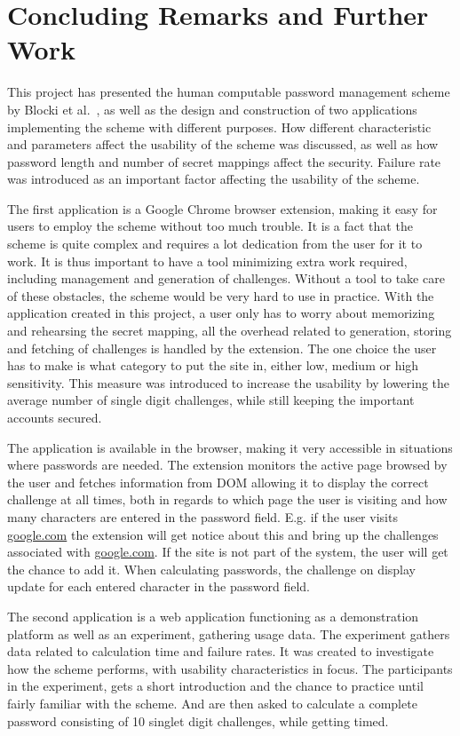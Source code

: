 \chapter{Concluding Remarks and Further Work}
This project has presented the human computable password management scheme by Blocki et al.~\cite{hcp-blocki}, as well as the design and construction of two applications implementing the scheme with different purposes. How different characteristic and parameters affect the usability of the scheme was discussed, as well as how password length and number of secret mappings affect the security. Failure rate was introduced as an important factor affecting the usability of the scheme. 
\par The first application is a Google Chrome browser extension, making it easy for users to employ the scheme without too much trouble. It is a fact that the scheme is quite complex and requires a lot dedication from the user for it to work. It is thus important to have a tool minimizing extra work required, including management and generation of challenges. Without a tool to take care of these obstacles, the scheme would be very hard to use in practice. With the application created in this project, a user only has to worry about memorizing and rehearsing the secret mapping, all the overhead related to generation, storing and fetching of challenges is handled by the extension. The one choice the user has to make is what category to put the site in, either low, medium or high sensitivity. This measure was introduced to increase the usability by lowering the average number of single digit challenges, while still keeping the important accounts secured.
\par The application is available in the browser, making it very accessible in situations where passwords are needed. The extension monitors the active page browsed by the user and fetches information from DOM allowing it to display the correct challenge at all times, both in regards to which page the user is visiting and how many characters are entered in the password field. E.g. if the user visits \url{google.com} the extension will get notice about this and bring up the challenges associated with \url{google.com}. If the site is not part of the system, the user will get the chance to add it. When calculating passwords, the challenge on display update for each entered character in the password field.
\par The second application is a web application functioning as a demonstration platform as well as an experiment, gathering usage data. The experiment gathers data related to calculation time and failure rates. It was created to investigate how the scheme performs, with usability characteristics in focus. The participants in the experiment, gets a short introduction and the chance to practice until fairly familiar with the scheme. And are then asked to calculate a complete password consisting of 10 singlet digit challenges, while getting timed.
